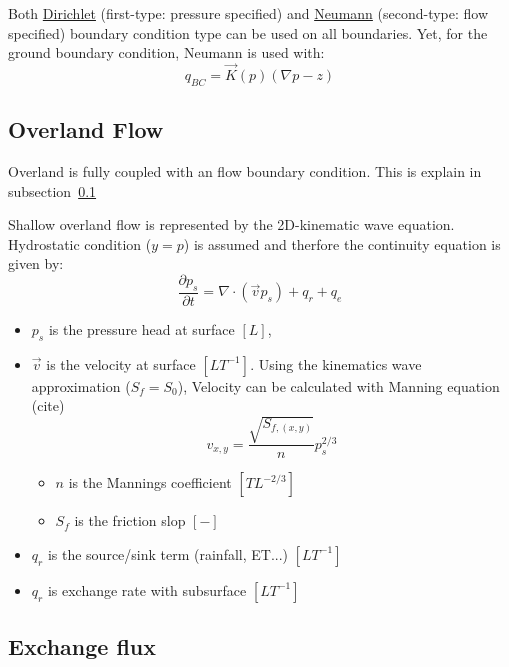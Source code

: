 \documentclass[11pt,a4paper]{report}
\begin{document}
Both \href{https://en.wikipedia.org/wiki/Dirichlet_boundary_condition}{Dirichlet} (first-type: pressure specified) and \href{https://en.wikipedia.org/wiki/Neumann_boundary_condition}{Neumann} (second-type: flow specified) boundary condition type can be used on all boundaries. Yet, for the ground boundary condition, Neumann is used with:
\begin{equation}
q_{BC} = \vec{K}(p)(\nabla p - z)
\end{equation}

\subsection{Overland Flow}
\label{subsec:overlandflow}


Overland is fully coupled with an flow boundary condition. This is explain in subsection~\ref{subsec:overlandflow}

Shallow overland flow is represented by the 2D-kinematic wave equation. Hydrostatic condition ($y=p$) is assumed and therfore the continuity equation is given by:
\begin{equation}
\frac{\partial p_s}{\partial t} = \nabla \cdot (\vec{v}p_s) +q_r+q_e
\end{equation} 
\begin{itemize}
	\item $p_s$ is the pressure head at surface $[L]$,
	\item $\vec{v}$ is the velocity at surface $[L T^{-1}]$. Using the kinematics wave approximation ($S_f=S_0$), Velocity can be calculated with Manning equation (cite)
	\begin{equation}
		v_{x,y}=\frac{\sqrt{S_{f,(x,y)}}}{n}p_s^{2/3}
	\end{equation}
	\begin{itemize}
		\item $n$ is the Mannings coefficient $[TL^{-2/3}]$
		\item $S_f$ is the friction slop $[-]$
	\end{itemize}
	\item $q_r$ is the source/sink term (rainfall, ET...) $[L T^{-1}]$
	\item $q_r$ is exchange rate with subsurface $[L T^{-1}]$
\end{itemize}


\subsection{Exchange flux}
\end{document}
